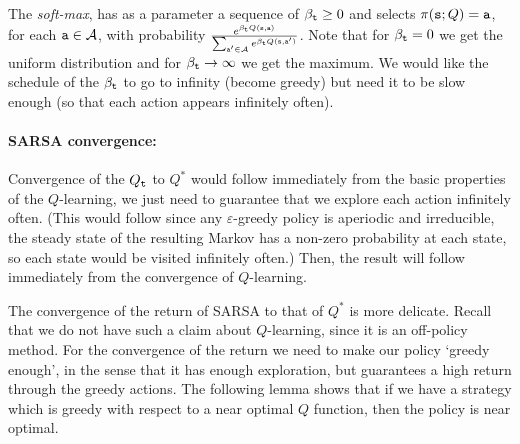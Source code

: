 The {\em soft-max}, has as a parameter a sequence of
$\beta_{\tt t}\geq 0$ and selects $\pi({\tt s};Q)={\tt a}$, for
each ${\tt a} \in \mathcal{A}$, with probability $\frac{e^{\beta_{\tt t}
Q({\tt s},{\tt a})}}{\sum_{{\tt a}'\in \mathcal{A}}e^{\beta_{\tt t}
Q({\tt s},{\tt a}')}}$. Note that for $\beta_{\tt t}=0$ we get the
uniform distribution and for $\beta_{\tt t}\rightarrow \infty$ we get
the maximum. We would like the schedule of the $\beta_{\tt t}$ to go
to infinity (become greedy) but need it to be slow enough (so that
each action appears infinitely often).

\paragraph{SARSA convergence:}
Convergence of the $Q_{\tt t}$ to $Q^*$ would follow immediately from
the basic properties of the $Q$-learning, we just need to guarantee
that we explore each action infinitely often. (This would follow
since any $\varepsilon$-greedy policy is aperiodic and irreducible,
the steady state of the resulting Markov has a non-zero probability
at each state, so each state would be visited infinitely often.)
Then, the result will follow immediately from the convergence of
$Q$-learning.

The convergence of the return of SARSA to that of $Q^*$ is more
delicate. Recall that we do not have such a claim about
$Q$-learning, since it is an off-policy method. For the convergence
of the return we need to make our policy `greedy enough', in the
sense that it has enough exploration, but guarantees a high return
through the greedy actions. The following lemma shows that if we
have a strategy which is greedy with respect to a near optimal $Q$
function, then the policy is near optimal.

